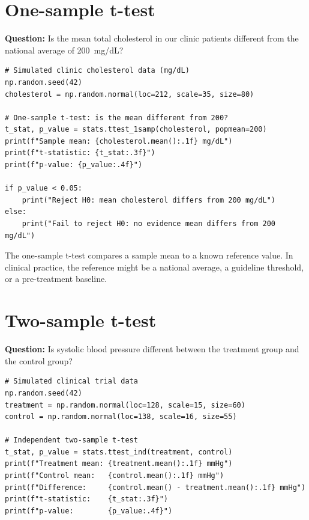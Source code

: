 \section{One-sample t-test}

\textbf{Question:} Is the mean total cholesterol in our clinic patients different from the national average of 200~mg/dL?

\begin{verbatim}
# Simulated clinic cholesterol data (mg/dL)
np.random.seed(42)
cholesterol = np.random.normal(loc=212, scale=35, size=80)

# One-sample t-test: is the mean different from 200?
t_stat, p_value = stats.ttest_1samp(cholesterol, popmean=200)
print(f"Sample mean: {cholesterol.mean():.1f} mg/dL")
print(f"t-statistic: {t_stat:.3f}")
print(f"p-value: {p_value:.4f}")

if p_value < 0.05:
    print("Reject H0: mean cholesterol differs from 200 mg/dL")
else:
    print("Fail to reject H0: no evidence mean differs from 200 mg/dL")
\end{verbatim}

\begin{clinicalnote}
The one-sample t-test compares a sample mean to a known reference value. In clinical practice, the reference might be a national average, a guideline threshold, or a pre-treatment baseline.
\end{clinicalnote}

\section{Two-sample t-test}

\textbf{Question:} Is systolic blood pressure different between the treatment group and the control group?

\begin{verbatim}
# Simulated clinical trial data
np.random.seed(42)
treatment = np.random.normal(loc=128, scale=15, size=60)
control = np.random.normal(loc=138, scale=16, size=55)

# Independent two-sample t-test
t_stat, p_value = stats.ttest_ind(treatment, control)
print(f"Treatment mean: {treatment.mean():.1f} mmHg")
print(f"Control mean:   {control.mean():.1f} mmHg")
print(f"Difference:     {control.mean() - treatment.mean():.1f} mmHg")
print(f"t-statistic:    {t_stat:.3f}")
print(f"p-value:        {p_value:.4f}")
\end{verbatim}

